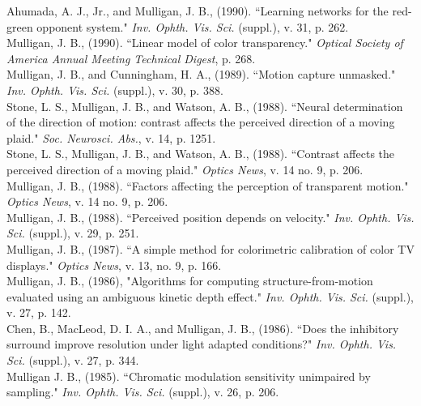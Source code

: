 \documentclass[12pt]{article}
\newcommand{\years}[1]{\marginnote{\scriptsize #1}}
\begin{document}
Ahumada, A. J., Jr., and Mulligan, J. B., (1990).
``Learning networks for the red-green opponent system."
\emph{Inv. Ophth. Vis. Sci.} (suppl.), v. 31, p. 262.\\

\clearpage
Mulligan, J. B., (1990).
``Linear model of color transparency."
\emph{Optical Society of America Annual Meeting Technical Digest},
p. 268.\\

\years{1989}
Mulligan, J. B., and Cunningham, H. A., (1989).
``Motion capture unmasked."
\emph{Inv. Ophth. Vis. Sci.} (suppl.), v. 30, p. 388.\\

\years{1988}
Stone, L. S., Mulligan, J. B., and Watson, A. B., (1988).
``Neural determination of the direction of motion:  contrast affects the perceived direction of a moving plaid."
\emph{Soc. Neurosci. Abs.},
v. 14, p. 1251.\\

Stone, L. S., Mulligan, J. B., and Watson, A. B., (1988).
``Contrast affects the perceived direction of a moving plaid."
\emph{Optics News},  v. 14 no. 9, p. 206.\\

Mulligan, J. B., (1988).
``Factors affecting the perception of transparent motion."
\emph{Optics News},  v. 14 no. 9, p. 206.\\

Mulligan, J. B., (1988).
``Perceived position depends on velocity."
\emph{Inv. Ophth. Vis. Sci.} (suppl.), v. 29, p. 251.\\

\years{1987}
Mulligan, J. B., (1987).
``A simple method for colorimetric calibration of color TV displays."
\emph{Optics News},  v. 13, no. 9, p. 166.\\

\years{1986}
Mulligan, J. B., (1986), "Algorithms for computing structure-from-motion
evaluated using an ambiguous kinetic depth effect."
\emph{Inv. Ophth. Vis. Sci.}
(suppl.), v. 27, p. 142.\\

Chen, B., MacLeod, D. I. A., and Mulligan, J. B., (1986).
``Does the inhibitory surround improve resolution under light adapted conditions?"
\emph{Inv. Ophth. Vis. Sci.} (suppl.), v. 27, p. 344.\\

\years{1985}
Mulligan J. B., (1985).
``Chromatic modulation sensitivity unimpaired by sampling."
\emph{Inv. Ophth. Vis. Sci.} (suppl.), v. 26, p. 206.\\
\end{document}
